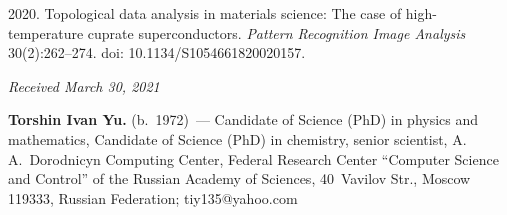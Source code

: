 \begin{multicols}{2}
{{\begin{thebibliography}{99}
 2020. Topological data analysis in materials science: 
The case of high-temperature cuprate superconductors. \textit{Pattern Recognition Image Analysis} 
30(2):262--274.  doi: 10.1134/S1054661820020157.
\end{thebibliography}

 }
 }

\end{multicols}

\vspace*{-6pt}

\hfill{\small\textit{Received March 30, 2021}}



  \Contrl
  
  \noindent
  \textbf{Torshin Ivan Yu.} (b.\ 1972)~--- Candidate of Science (PhD) in physics and mathematics, 
Candidate of Science (PhD) in chemistry, senior scientist, A.\,A.~Dorodnicyn Computing Center, 
Federal Research Center ``Computer Science and Control'' of the Russian Academy of Sciences, 
40~Vavilov Str., Moscow 119333, Russian Federation; \mbox{tiy135@yahoo.com}



\label{end\stat}

\renewcommand{\bibname}{\protect\rm Литература} 